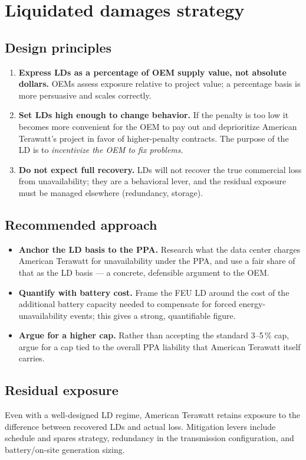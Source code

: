 \section{Liquidated damages strategy}

\subsection{Design principles}
\begin{enumerate}\setlength{\itemsep}{0.3em}
  \item \textbf{Express LDs as a percentage of OEM supply value, not absolute
        dollars.} OEMs assess exposure relative to project value; a percentage
        basis is more persuasive and scales correctly.
  \item \textbf{Set LDs high enough to change behavior.} If the penalty is too
        low it becomes more convenient for the OEM to pay out and deprioritize
        American Terawatt's project in favor of higher-penalty contracts. The
        purpose of the LD is to \emph{incentivize the OEM to fix problems}.
  \item \textbf{Do not expect full recovery.} LDs will not recover the true
        commercial loss from unavailability; they are a behavioral lever, and
        the residual exposure must be managed elsewhere (redundancy, storage).
\end{enumerate}

\subsection{Recommended approach}
\begin{itemize}\setlength{\itemsep}{0.25em}
  \item \textbf{Anchor the LD basis to the PPA.} Research what the data center
        charges American Terawatt for unavailability under the PPA, and use a
        fair share of that as the LD basis --- a concrete, defensible argument
        to the OEM.
  \item \textbf{Quantify with battery cost.} Frame the FEU LD around the cost of
        the additional battery capacity needed to compensate for forced
        energy-unavailability events; this gives a strong, quantifiable figure.
  \item \textbf{Argue for a higher cap.} Rather than accepting the standard
        3--5\,\% cap, argue for a cap tied to the overall PPA liability that
        American Terawatt itself carries.
\end{itemize}

\subsection{Residual exposure}
Even with a well-designed LD regime, American Terawatt retains exposure to the
difference between recovered LDs and actual loss. Mitigation levers include
schedule and spares strategy, redundancy in the transmission configuration, and
battery/on-site generation sizing.
